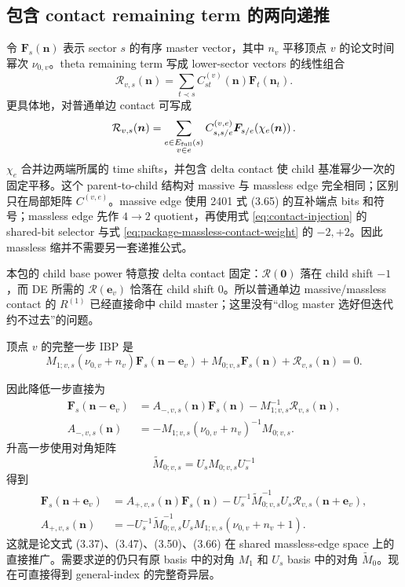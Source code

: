 \documentclass[11pt,a4paper]{ctexart}
\newcommand{\cR}{\mathcal R}
\begin{document}
\subsection{包含 contact remaining term 的两向递推}

令 $\bm F_s(\bm n)$ 表示 sector $s$ 的有序 master vector，其中 $n_v$ 平移顶点 $v$ 的论文时间幂次 $\nu_{0,v}$。theta remaining term 写成 lower-sector vectors 的线性组合
\begin{equation}
 \cR_{v,s}(\bm n)
 =\sum_{t\prec s}C_{st}^{(v)}(\bm n)\bm F_t(\bm n_t).
 \label{eq:R-as-CF}
\end{equation}
更具体地，对普通单边 contact 可写成
\begin{equation}
 \cR_{v,s}(\bm n)
 =\sum_{\substack{e\in E_{\rm full}(s)\\v\in e}}
 C_{s,s/e}^{(v,e)}
 \bm F_{s/e}\!\left(\chi_e(\bm n)\right).
 \label{eq:R-edge-sum}
\end{equation}
$\chi_e$ 合并边两端所属的 time shifts，并包含 delta contact 使 child 基准幂少一次的固定平移。这个 parent-to-child 结构对 massive 与 massless edge 完全相同；区别只在局部矩阵 $C^{(v,e)}$。massive edge 使用 2401 式 (3.65) 的互补端点 bits 和符号；massless edge 先作 $4\to2$ quotient，再使用式 \eqref{eq:contact-injection} 的 shared-bit selector 与式 \eqref{eq:package-massless-contact-weight} 的 $-2,+2$。因此 massless 缩并不需要另一套递推公式。

本包的 child base power 特意按 delta contact 固定：$\cR(\bm0)$ 落在 child shift $-1$，而 DE 所需的 $\cR(\bm e_v)$ 恰落在 child shift $0$。所以普通单边 massive/massless contact 的 $R^{(1)}$ 已经直接命中 child master；这里没有“dlog master 选好但迭代约不过去”的问题。

顶点 $v$ 的完整一步 IBP 是
\begin{equation}
 M_{1;v,s}(\nu_{0,v}+n_v)\bm F_s(\bm n-\bm e_v)
 +M_{0;v,s}\bm F_s(\bm n)
 +\cR_{v,s}(\bm n)=0.
 \label{eq:global-one-step-ibp}
\end{equation}

因此降低一步直接为
\begin{align}
 \bm F_s(\bm n-\bm e_v)
 &=A_{-,v,s}(\bm n)\bm F_s(\bm n)
 -M_{1;v,s}^{-1}\cR_{v,s}(\bm n),\\
 A_{-,v,s}(\bm n)
 &=-M_{1;v,s}(\nu_{0,v}+n_v)^{-1}M_{0;v,s}.
 \label{eq:global-Aminus}
\end{align}
升高一步使用对角矩阵
\begin{equation}
 \widetilde M_{0;v,s}=U_sM_{0;v,s}U_s^{-1}
\end{equation}
得到
\begin{align}
 \bm F_s(\bm n+\bm e_v)
 &=A_{+,v,s}(\bm n)\bm F_s(\bm n)
 -U_s^{-1}\widetilde M_{0;v,s}^{-1}U_s
 \cR_{v,s}(\bm n+\bm e_v),\\
 A_{+,v,s}(\bm n)
 &=-U_s^{-1}\widetilde M_{0;v,s}^{-1}U_s
 M_{1;v,s}(\nu_{0,v}+n_v+1).
 \label{eq:global-Aplus}
\end{align}
这就是论文式 (3.37)、(3.47)、(3.50)、(3.66) 在 shared massless-edge space 上的直接推广。需要求逆的仍只有原 basis 中的对角 $M_1$ 和 $U_s$ basis 中的对角 $\widetilde M_0$。现在可直接得到 general-index 的完整奇异层。
\end{document}
